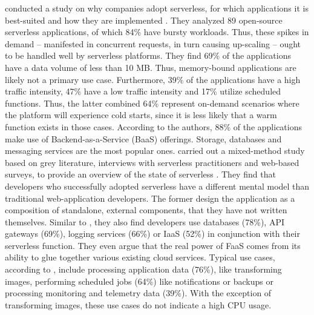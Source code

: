 \citeauthor{Eismann2021} conducted a study on why companies adopt serverless, for which applications it is best-suited and how they are implemented \cite{Eismann2021}. They analyzed 89 open-source serverless applications, of which 84\% have bursty workloads. Thus, these spikes in demand -- manifested in concurrent requests, in turn causing up-scaling -- ought to be handled well by serverless platforms.
They find 69\% of the applications have a data volume of less than 10 MB. Thus, memory-bound applications are likely not a primary use case. Furthermore, 39\% of the applications have a high traffic intensity, 47\% have a low traffic intensity and 17\% utilize scheduled functions. Thus, the latter combined 64\% represent on-demand scenarios where the platform will experience cold starts, since it is less likely that a warm function exists in those cases. According to the authors, 88\% of the applications make use of Backend-as-a-Service (BaaS) offerings. Storage, databases and messaging services are the most popular ones.
\citeauthor{Leitner2019} carried out a mixed-method study based on grey literature, interviews with serverless practitioners and web-based surveys, to provide an overview of the state of serverless \cite{Leitner2019}. They find that developers who successfully adopted serverless have a different mental model than traditional web-application developers. The former design the application as a composition of standalone, external components, that they have not written themselves. Similar to \citeauthor{Eismann2021}, they also find developers use databases (78\%), API gateways (69\%), logging services (66\%) or IaaS (52\%) in conjunction with their serverless function. They even argue that the real power of FaaS comes from its ability to glue together various existing cloud services.
Typical use cases, according to \citeauthor{Leitner2019}, include processing application data (76\%), like transforming images, performing scheduled jobs (64\%) like notifications or backups or processing monitoring and telemetry data (39\%). With the exception of transforming images, these use cases do not indicate a high CPU usage.

